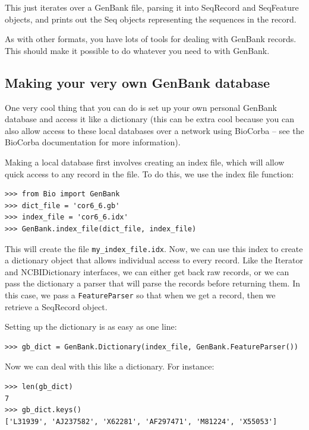 \documentclass{report}
\begin{document}
This just iterates over a GenBank file, parsing it into SeqRecord and SeqFeature objects, and prints out the Seq objects representing the sequences in the record.


As with other formats, you have lots of tools for dealing with GenBank records. This should make it possible to do whatever you need to with GenBank.

\subsection{Making your very own GenBank database}

One very cool thing that you can do is set up your own personal GenBank database and access it like a dictionary (this can be extra cool because you can also allow access to these local databases over a network using BioCorba -- see the BioCorba documentation for more information).


Making a local database first involves creating an index file, which will allow quick access to any record in the file. To do this, we use the index file function:

\begin{verbatim}
>>> from Bio import GenBank
>>> dict_file = 'cor6_6.gb'
>>> index_file = 'cor6_6.idx'
>>> GenBank.index_file(dict_file, index_file)
\end{verbatim}

This will create the file \verb|my_index_file.idx|. Now, we can use this index to create a dictionary object that allows individual access to every record. Like the Iterator and NCBIDictionary interfaces, we can either get back raw records, or we can pass the dictionary a parser that will parse the records before returning them. In this case, we pass a \verb|FeatureParser| so that when we get a record, then we retrieve a SeqRecord object. 


Setting up the dictionary is as easy as one line:

\begin{verbatim}
>>> gb_dict = GenBank.Dictionary(index_file, GenBank.FeatureParser())
\end{verbatim}

Now we can deal with this like a dictionary. For instance:

\begin{verbatim}
>>> len(gb_dict)
7
>>> gb_dict.keys()
['L31939', 'AJ237582', 'X62281', 'AF297471', 'M81224', 'X55053']
\end{verbatim}
\end{document}
